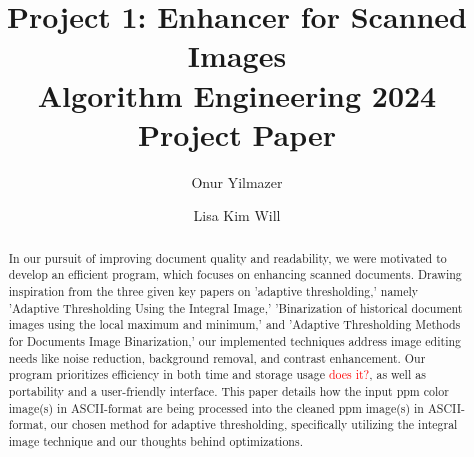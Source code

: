 \documentclass[sigconf]{acmart}
\begin{document}
\title[Project 1: Enhancer for Scanned Images]{Project 1: Enhancer for Scanned Images\\\large Algorithm Engineering 2024 Project Paper}


\author{Onur Yilmazer}

\author{Lisa Kim Will}


\begin{abstract}

In our pursuit of improving document quality and readability, we were motivated to develop an efficient program, which focuses on enhancing scanned documents. Drawing inspiration from the three given key papers on 'adaptive thresholding,' namely 'Adaptive Thresholding Using the Integral Image,' 'Binarization of historical document images using the local maximum and minimum,' and 'Adaptive Thresholding Methods for Documents Image Binarization,' our implemented techniques address image editing needs like noise reduction, background removal, and contrast enhancement. Our program prioritizes efficiency in both time and storage usage \textcolor{red}{does it?}, as well as portability and a user-friendly interface. This paper details how the input ppm color image(s) in ASCII-format are being processed into the cleaned ppm image(s) in ASCII-format, our chosen method for adaptive thresholding, specifically utilizing the integral image technique and our thoughts behind optimizations.

\end{abstract}



\maketitle
\end{document}
